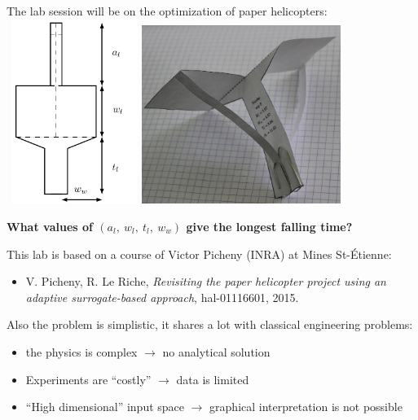 \documentclass{beamer}
\begin{document}
\begin{frame}{}
The lab session will be on the optimization of paper helicopters:\\
\vspace{3mm} \
\hspace{-5mm}\includegraphics[height=6cm]{figures/latexdraw/helico} \quad \includegraphics[height=5.8cm]{figures/helicopter2}
\vspace{4mm}
\begin{center}
	\textbf{What values of $(a_l,\ w_l,\ t_l,\ w_w)$ give the longest falling time?}
\end{center}
\end{frame}

\begin{frame}{}
This lab is based on a course of Victor Picheny (INRA) at Mines St-\'Etienne: 
\begin{itemize}
	\item[] \small V. Picheny, R. Le Riche, \emph{Revisiting the paper helicopter project using an adaptive surrogate-based approach}, hal-01116601, 2015.
\end{itemize}
\vspace{5mm}
Also the problem is simplistic, it shares a lot with classical engineering problems:
\begin{itemize}
	\item the physics is complex $\rightarrow$ no analytical solution
	\item Experiments are ``costly'' $\rightarrow$ data is limited
	\item ``High dimensional'' input space $\rightarrow$ graphical interpretation is not possible
\end{itemize}
\end{frame}
\end{document}
